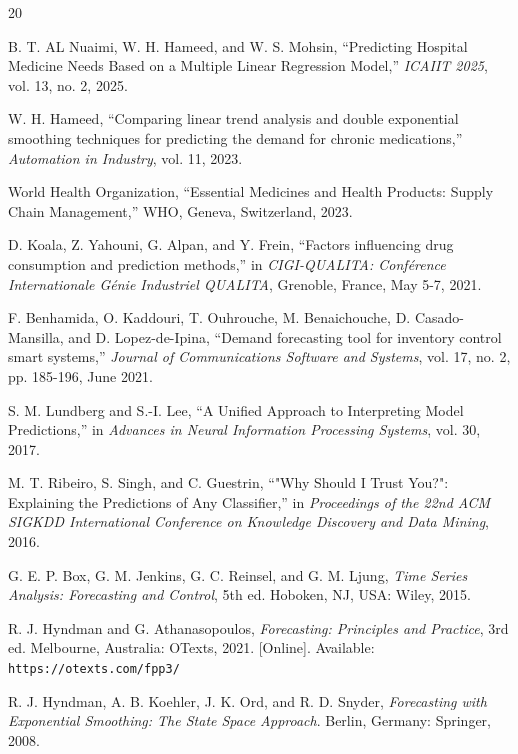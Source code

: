 \documentclass[conference]{IEEEtran}
\begin{document}
\begin{thebibliography}{20}

 B. T. AL Nuaimi, W. H. Hameed, and W. S. Mohsin, ``Predicting Hospital Medicine Needs Based on a Multiple Linear Regression Model,'' \textit{ICAIIT 2025}, vol. 13, no. 2, 2025.

 W. H. Hameed, ``Comparing linear trend analysis and double exponential smoothing techniques for predicting the demand for chronic medications,'' \textit{Automation in Industry}, vol. 11, 2023.

 World Health Organization, ``Essential Medicines and Health Products: Supply Chain Management,'' WHO, Geneva, Switzerland, 2023.

 D. Koala, Z. Yahouni, G. Alpan, and Y. Frein, ``Factors influencing drug consumption and prediction methods,'' in \textit{CIGI-QUALITA: Conférence Internationale Génie Industriel QUALITA}, Grenoble, France, May 5-7, 2021.

 F. Benhamida, O. Kaddouri, T. Ouhrouche, M. Benaichouche, D. Casado-Mansilla, and D. Lopez-de-Ipina, ``Demand forecasting tool for inventory control smart systems,'' \textit{Journal of Communications Software and Systems}, vol. 17, no. 2, pp. 185-196, June 2021.

 S. M. Lundberg and S.-I. Lee, ``A Unified Approach to Interpreting Model Predictions,'' in \textit{Advances in Neural Information Processing Systems}, vol. 30, 2017.

 M. T. Ribeiro, S. Singh, and C. Guestrin, ``"Why Should I Trust You?": Explaining the Predictions of Any Classifier,'' in \textit{Proceedings of the 22nd ACM SIGKDD International Conference on Knowledge Discovery and Data Mining}, 2016.

 G. E. P. Box, G. M. Jenkins, G. C. Reinsel, and G. M. Ljung, \textit{Time Series Analysis: Forecasting and Control}, 5th ed. Hoboken, NJ, USA: Wiley, 2015.

 R. J. Hyndman and G. Athanasopoulos, \textit{Forecasting: Principles and Practice}, 3rd ed. Melbourne, Australia: OTexts, 2021. [Online]. Available: \texttt{https://otexts.com/fpp3/}

 R. J. Hyndman, A. B. Koehler, J. K. Ord, and R. D. Snyder, \textit{Forecasting with Exponential Smoothing: The State Space Approach}. Berlin, Germany: Springer, 2008.


\end{thebibliography}
\end{document}
